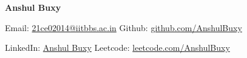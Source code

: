 \documentclass{article}
\begin{document}

{\LARGE \bf Anshul Buxy \par}
  
{\normalsize Email: \href{mailto: 21ce02014@iitbbs.ac.in>}{21ce02014@iitbbs.ac.in}}
\noindent\hfill Github: \href{https://github.com/AnshulBuxy}{github.com/AnshulBuxy}



{\normalsize LinkedIn: \href{https://www.linkedin.com/in/anshul-buxy-72678b228/}{Anshul Buxy}}
\noindent{\hfill}Leetcode: \href{https://leetcode.com/u/anshulbuxy12345/}{leetcode.com/AnshulBuxy}\

\vspace{-2mm}
\end{document}
